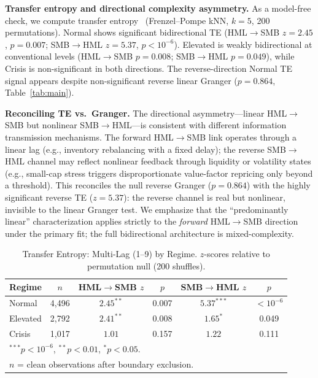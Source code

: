 \documentclass[sigconf,anonymous]{acmart}
\begin{document}
\textbf{Transfer entropy and directional complexity asymmetry.}
As a model-free check, we compute transfer entropy~\cite{schreiber2000measuring,barnett2009granger}
(Frenzel--Pompe kNN, $k=5$, 200 permutations).
Normal shows significant bidirectional TE (HML$\to$SMB $z = 2.45$, $p = 0.007$;
SMB$\to$HML $z = 5.37$, $p < 10^{-6}$). Elevated is weakly bidirectional at
conventional levels (HML$\to$SMB $p = 0.008$; SMB$\to$HML $p = 0.049$), while
Crisis is non-significant in both directions. The reverse-direction Normal TE
signal appears despite non-significant reverse linear Granger
($p = 0.864$, Table~\ref{tab:main}).

\textbf{Reconciling TE vs.\ Granger.} The directional asymmetry---linear
HML$\to$SMB but nonlinear SMB$\to$HML---is consistent with different
information transmission mechanisms. The forward HML$\to$SMB link
operates through a linear lag (e.g., inventory rebalancing with a
fixed delay); the reverse SMB$\to$HML channel may reflect nonlinear
feedback through liquidity or volatility states (e.g., small-cap stress
triggers disproportionate value-factor repricing only beyond a threshold).
This reconciles the null reverse Granger ($p = 0.864$) with the
highly significant reverse TE ($z = 5.37$): the reverse channel
is real but nonlinear, invisible to the linear Granger test.
We emphasize that the ``predominantly linear'' characterization applies
strictly to the \emph{forward} HML$\to$SMB direction under the primary fit;
the full bidirectional architecture is mixed-complexity.

\begin{table}[t]
\centering
\caption{Transfer Entropy: Multi-Lag (1--9) by Regime.
$z$-scores relative to permutation null (200 shuffles).}
\label{tab:te}
\scriptsize
\begin{tabular}{@{}lccccc@{}}
\toprule
Regime & $n$ & HML$\to$SMB $z$ & $p$ & SMB$\to$HML $z$ & $p$ \\
\midrule
Normal & 4,496 & $2.45^{**}$ & 0.007 & $5.37^{***}$ & $< 10^{-6}$ \\
Elevated & 2,792 & $2.41^{**}$ & 0.008 & $1.65^{*}$ & 0.049 \\
Crisis & 1,017 & $1.01$ & 0.157 & $1.22$ & 0.111 \\
\bottomrule
\multicolumn{6}{l}{\footnotesize $^{***}p < 10^{-6}$, $^{**}p < 0.01$, $^{*}p < 0.05$.} \\
\multicolumn{6}{l}{\footnotesize $n$ = clean observations after boundary exclusion.} \\
\end{tabular}
\end{table}
\end{document}
